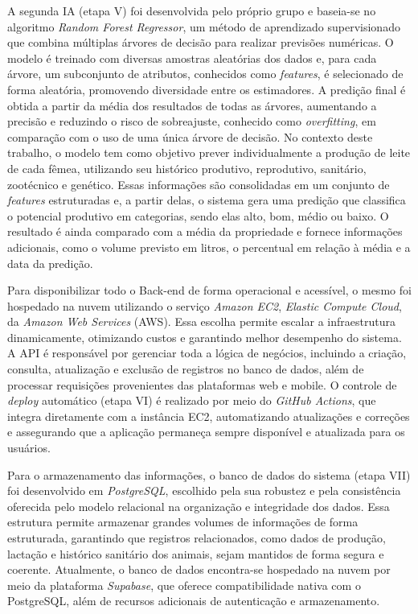 A segunda IA (etapa V) foi desenvolvida pelo próprio grupo e baseia-se no algoritmo \textit{Random Forest Regressor}, um método de aprendizado supervisionado que combina múltiplas árvores de decisão para realizar previsões numéricas. O modelo é treinado com diversas amostras aleatórias dos dados e, para cada árvore, um subconjunto de atributos, conhecidos como \textit{features}, é selecionado de forma aleatória, promovendo diversidade entre os estimadores. A predição final é obtida a partir da média dos resultados de todas as árvores, aumentando a precisão e reduzindo o risco de sobreajuste, conhecido como \textit{overfitting}, em comparação com o uso de uma única árvore de decisão. No contexto deste trabalho, o modelo tem como objetivo prever individualmente a produção de leite de cada fêmea, utilizando seu histórico produtivo, reprodutivo, sanitário, zootécnico e genético. Essas informações são consolidadas em um conjunto de \textit{features} estruturadas e, a partir delas, o sistema gera uma predição que classifica o potencial produtivo em categorias, sendo elas alto, bom, médio ou baixo. O resultado é ainda comparado com a média da propriedade e fornece informações adicionais, como o volume previsto em litros, o percentual em relação à média e a data da predição.

Para disponibilizar todo o Back-end de forma operacional e acessível, o mesmo foi hospedado na nuvem utilizando o serviço \textit{Amazon EC2}, \textit{Elastic Compute Cloud}, da \textit{Amazon Web Services} (AWS). Essa escolha permite escalar a infraestrutura dinamicamente, otimizando custos e garantindo melhor desempenho do sistema. A API é responsável por gerenciar toda a lógica de negócios, incluindo a criação, consulta, atualização e exclusão de registros no banco de dados, além de processar requisições provenientes das plataformas web e mobile. O controle de \textit{deploy} automático (etapa VI) é realizado por meio do \textit{GitHub Actions}, que integra diretamente com a instância EC2, automatizando atualizações e correções e assegurando que a aplicação permaneça sempre disponível e atualizada para os usuários.

Para o armazenamento das informações, o banco de dados do sistema (etapa VII) foi desenvolvido em \textit{PostgreSQL}, escolhido pela sua robustez e pela consistência oferecida pelo modelo relacional na organização e integridade dos dados. Essa estrutura permite armazenar grandes volumes de informações de forma estruturada, garantindo que registros relacionados, como dados de produção, lactação e histórico sanitário dos animais, sejam mantidos de forma segura e coerente. Atualmente, o banco de dados encontra-se hospedado na nuvem por meio da plataforma \textit{Supabase}, que oferece compatibilidade nativa com o PostgreSQL, além de recursos adicionais de autenticação e armazenamento.

